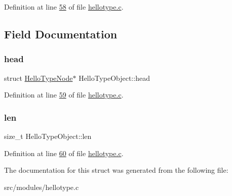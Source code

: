 Definition at line \hyperlink{hellotype_8c_source_l00058}{58} of file \hyperlink{hellotype_8c_source}{hellotype.\+c}.



\subsection{Field Documentation}
\mbox{\label{structHelloTypeObject_af38a0b3b133d4e05dcb44afc89a35fa1}} 
\subsubsection{\texorpdfstring{head}{head}}
{\footnotesize\ttfamily struct \hyperlink{structHelloTypeNode}{Hello\+Type\+Node}$\ast$ Hello\+Type\+Object\+::head}



Definition at line \hyperlink{hellotype_8c_source_l00059}{59} of file \hyperlink{hellotype_8c_source}{hellotype.\+c}.

\mbox{\label{structHelloTypeObject_abf4dafc3ddd55319e83121868159d7bb}} 
\subsubsection{\texorpdfstring{len}{len}}
{\footnotesize\ttfamily size\+\_\+t Hello\+Type\+Object\+::len}



Definition at line \hyperlink{hellotype_8c_source_l00060}{60} of file \hyperlink{hellotype_8c_source}{hellotype.\+c}.



The documentation for this struct was generated from the following file\+:\begin{DoxyCompactItemize}
\item 
src/modules/hellotype.\+c\end{DoxyCompactItemize}

